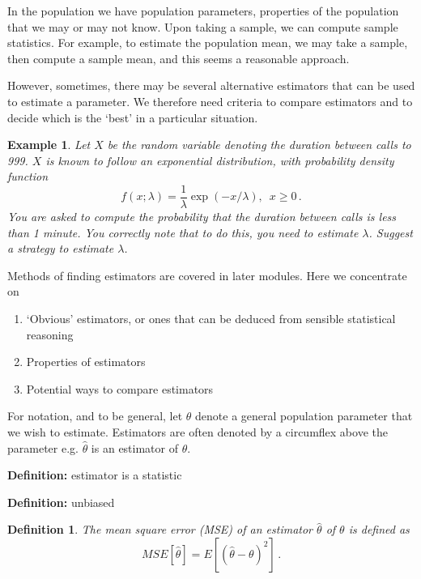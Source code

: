 \documentclass[12pt]{article}
\theoremstyle{break}
\newtheorem{definition}[theorem]{Definition}
\newtheorem{example}[theorem]{Example}
\begin{document}
In the population we have population parameters, properties of the population that we may or may not know. Upon taking a sample, we can compute sample statistics. For example, to estimate the population mean, we may take a sample, then compute a sample mean, and this seems a reasonable approach.

However, sometimes, there may be several alternative estimators that can be used to estimate a parameter. We therefore need criteria to compare estimators and to decide which is the `best' in a particular situation.

\begin{example}
Let $X$ be the random variable denoting the duration between calls to 999. $X$ is known to follow an exponential distribution, with probability density function
\begin{equation*}
f(x;\lambda)=\frac{1}{\lambda}\exp(-x/\lambda), \,\,\, x \geq 0 \, .
\end{equation*}
You are asked to compute the probability that the duration between calls is less than 1 minute. You correctly note that to do this, you need to estimate $\lambda$. Suggest a strategy to estimate $\lambda$.
\end{example}

Methods of finding estimators are covered in later modules. Here we concentrate on
\begin{enumerate}
\item `Obvious' estimators, or ones that can be deduced from sensible statistical reasoning
\item Properties of estimators
\item Potential ways to compare estimators
\end{enumerate}

For notation, and to be general, let $\theta$ denote a general population parameter that we wish to estimate. Estimators are often denoted by a circumflex above the parameter e.g. $\hat{\theta}$ is an estimator of $\theta$.
\begin{mdframed}
{\bf Definition:}
\textcolor[rgb]{1.00,1.00,1.00}{estimator is a statistic\lipsum[1-2]}
\end{mdframed}

\begin{mdframed}
{\bf Definition:}
\textcolor[rgb]{1.00,1.00,1.00}{unbiased \lipsum[1-2]}
\end{mdframed}

\begin{definition}
The mean square error (MSE) of an estimator $\hat{\theta}$ of $\theta$ is defined as $$MSE[\hat{\theta}]=E \left[(\hat{\theta}-\theta)^{2}\right] \,.$$
\end{definition}
\end{document}
